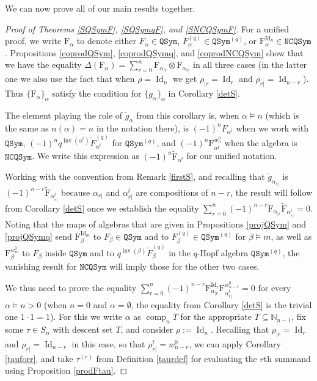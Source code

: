 \documentclass{article}
\theoremstyle{definition}
\begin{document}
We can now prove all of our main results together.
\begin{proof}[Proof of Theorems \ref{SQSymF}, \ref{SQSymqF}, and \ref{SNCQSymF}]
For a unified proof, we write $\mathrm{F}_{\alpha}$ to denote either $F_{\alpha}\in\mathtt{QSym}$, $F_{\alpha}^{(q)}\in\mathtt{QSym}^{(q)}$, or $\mathrm{F}_{\alpha}^{\operatorname{Id}_{n}}\in\mathtt{NCQSym}$. Propositions \ref{coprodQSym}, \ref{coprodQSymq}, and \ref{coprodNCQSym} show that we have the equality $\Delta(\mathrm{F}_{\alpha})=\sum_{r=0}^{n}\mathrm{F}_{\alpha_{|r}}\otimes\mathrm{F}_{\alpha_{r|}}$ in all three cases (in the latter one we also use the fact that when $\rho=\operatorname{Id}_{n}$ we get $\rho_{|r}=\operatorname{Id}_{r}$ and $\rho_{r|}=\operatorname{Id}_{n-r}$). Thus $\{\mathrm{F}_{\alpha}\}_{\alpha}$ satisfy the condition for $\{g_{\alpha}\}_{\alpha}$ in Corollary \ref{detS}.

The element playing the role of $\tilde{g}_{\alpha}$ from this corollary is, when $\alpha \vDash n$ (which is the same as $n(\alpha)=n$ in the notation there), is $(-1)^{n}F_{\alpha^{t}}$ when we work with $\mathtt{QSym}$, $(-1)^{n}q^{\operatorname{inv}(\alpha^{t})}\widetilde{F}_{\alpha^{t}}^{(q)}$ for $\mathtt{QSym}^{(q)}$, and $(-1)^{n}\mathrm{F}_{\alpha^{t}}^{w^{0}_{n}}$ when the algebra is $\mathtt{NCQSym}$. We write this expression as $(-1)^{n}\widetilde{\mathrm{F}}_{\alpha^{t}}$ for our unified notation.

Working with the convention from Remark \ref{firstS}, and recalling that $\tilde{g}_{\alpha_{r|}}$ is $(-1)^{n-r}\widetilde{\mathrm{F}}_{\alpha_{r|}^{t}}$ because $\alpha_{r|}$ and $\alpha_{r|}^{t}$ are compositions of $n-r$, the result will follow from Corollary \ref{detS} once we establish the equality $\sum_{r=0}^{n}(-1)^{n-r}\mathrm{F}_{\alpha_{|r}}\widetilde{\mathrm{F}}_{\alpha_{r|}^{t}}=0$. Noting that the maps of algebras that are given in Propositions \ref{projQSym} and \ref{projQSymq} send $\mathrm{F}_{\beta}^{\operatorname{Id}_{m}}$ to $F_{\beta}\in\mathtt{QSym}$ and to $F_{\beta}^{(q)}\in\mathtt{QSym}^{(q)}$ for $\beta \vDash m$, as well as $\mathrm{F}_{\beta}^{w^{0}_{m}}$ to $F_{\beta}$ inside $\mathtt{QSym}$ and to $q^{\operatorname{inv}(\beta)}\widetilde{F}_{\beta}^{(q)}$ in the $q$-Hopf algebra $\mathtt{QSym}^{(q)}$, the vanishing result for $\mathtt{NCQSym}$ will imply those for the other two cases.

We thus need to prove the equality $\sum_{r=0}^{n}(-1)^{n-r}\mathrm{F}_{\alpha_{|r}}^{\operatorname{Id}_{r}}\mathrm{F}_{\alpha_{r|}^{t}}^{w^{0}_{n-r}}=0$ for every $\alpha \vDash n>0$ (when $n=0$ and $\alpha=\emptyset$, the equality from Corollary \ref{detS} is the trivial one $1\cdot1=1$). For this we write $\alpha$ as $\operatorname{comp}_{n}T$ for the appropriate $T\subseteq\mathbb{N}_{n-1}$, fix some $\tau \in S_{n}$ with descent set $T$, and consider $\rho:=\operatorname{Id}_{n}$. Recalling that $\rho_{|r}=\operatorname{Id}_{r}$ and $\rho_{r|}=\operatorname{Id}_{n-r}$ in this case, so that $\rho_{r|}^{t}=w^{0}_{n-r}$, we can apply Corollary \ref{tauforr}, and take $\tau^{(r)}$ from Definition \ref{taurdef} for evaluating the $r$th summand using Proposition \ref{prodFtau}.


\end{proof}
\end{document}
